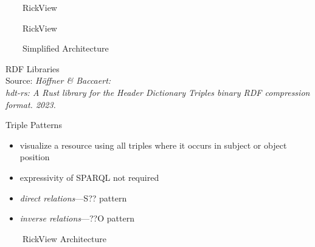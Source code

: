 \documentclass[14pt,aspectratio=169]{beamer}
\newcommand{\imageslide}[4][]
{
\begin{frame}[plain]{~~~~#2}
\vspace{0.2em}
\centering\makebox[\linewidth]{\texttt{[image: \#3]}}
\\#1
\note{#4}
\end{frame}
}
\begin{document}
\imageslide{RickView}{img/rickview-screenshot1.png}{}
\imageslide{RickView}{img/rickview-screenshot2.png}{}

\imageslide{Simplified Architecture}{img/architecture-simple.pdf}{}

\begin{frame}[plain]{RDF Libraries}
\centering
{}\\
\scriptsize Source: \emph{Höffner \& Baccaert:\\hdt-rs: A Rust library for the Header Dictionary Triples binary RDF compression format. 2023.}
\end{frame}

\begin{frame}{Triple Patterns}
\begin{itemize}
\item visualize a resource using all triples where it occurs in subject or object position
\item expressivity of SPARQL not required
\item \emph{direct relations}---S?? pattern
\item \emph{inverse relations}---??O pattern
\end{itemize}
\end{frame}

\imageslide{RickView Architecture}{img/architecture-rickview.pdf}{}
\end{document}
